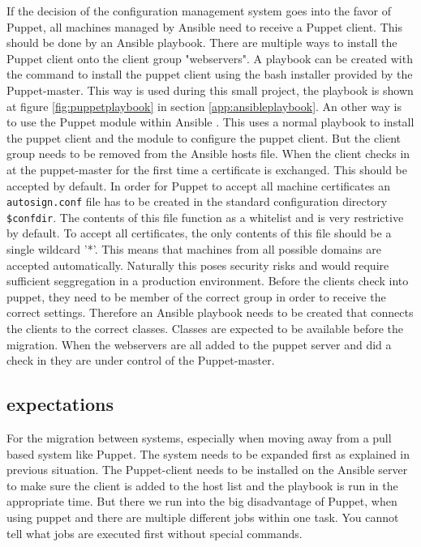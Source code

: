 If the decision of the configuration management system goes into the favor of Puppet, all machines managed by Ansible need to receive a Puppet client. This should be done by an Ansible playbook. There are multiple ways to install the Puppet client onto the client group "webservers". A playbook can be created with the command to install the puppet client using the bash installer provided by the Puppet-master. This way is used during this small project, the playbook is shown at figure \ref{fig:puppetplaybook} in section \ref{app:ansibleplaybook}. An other way is to use the Puppet module within Ansible \cite{ansiblepuppet}. This uses a normal playbook to install the puppet client and the module to configure the puppet client. But the client group needs to be removed from the Ansible hosts file. When the client checks in at the puppet-master for the first time a certificate is exchanged. This should be accepted by default. In order for Puppet to accept all machine certificates an \texttt{autosign.conf} file has to be created in the standard configuration directory \texttt{\$confdir}. The contents of this file function as a whitelist and is very restrictive by default. To accept all certificates, the only contents of this file should be a single wildcard '*'. This means that machines from all possible domains are accepted automatically. Naturally this poses security risks and would require sufficient seggregation in a production environment.
Before the clients check into puppet, they need to be member of the correct group in order to receive the correct settings. Therefore an Ansible playbook needs to be created that connects the clients to the correct classes. Classes are expected to be available before the migration. When the webservers are all added to the puppet server and did a check in they are under control of the Puppet-master.

\subsection{expectations}\label{subsec:expectations}
For the migration between systems, especially when moving away from a pull based system like Puppet. The system needs to be expanded first as explained in previous situation. The Puppet-client needs to be installed on the Ansible server to make sure the client is added to the host list and the playbook is run in the appropriate time. But there we run into the big disadvantage of Puppet, when using puppet and there are multiple different jobs within one task. You cannot tell what jobs are executed first without special commands.  

